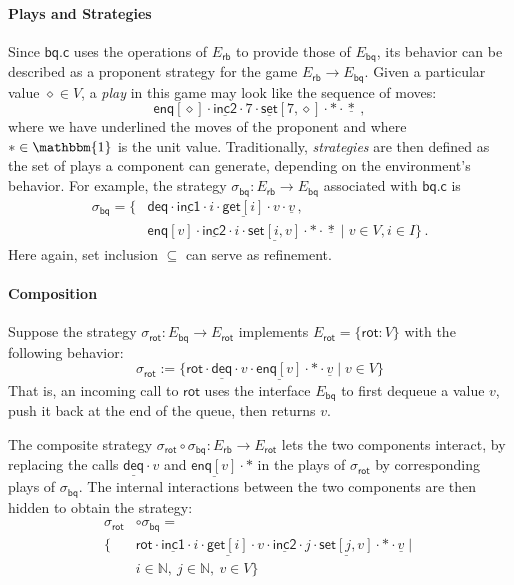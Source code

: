 \documentclass[sigplan,10pt,review,anonymous]{acmart}
\newcommand{\kw}[1]{\ensuremath{ \mathsf{#1} }}
\begin{document}
\paragraph{Plays and Strategies}

Since $\kw{bq.c}$
uses the operations of $E_\kw{rb}$ to
provide those of $E_\kw{bq}$,
its behavior
can be described as a proponent strategy for the game
$E_\kw{rb} \rightarrow E_\kw{bq}$.
Given a particular value $\diamond \in V$,
a \emph{play} in this game may look like the sequence of moves:
\[
  \kw{enq}[\diamond] \cdot
  \underline{\kw{inc2}} \cdot
  7 \cdot
  \underline{\kw{set}}[7, \diamond] \cdot
  * \cdot
  \underline*
  \:,
\]
where we have underlined the moves of the proponent
and where $* \in \mathbbm{1}$ is the unit value.
Traditionally,
\emph{strategies} are then defined as
the set of plays a component can generate,
depending on the environment's behavior.
For example,
the strategy
$\sigma_\kw{bq} : E_\kw{rb} \rightarrow E_\kw{bq}$
associated with $\kw{bq.c}$ is
\begin{align*}
  \sigma_\kw{bq} =
  \{ 
   &\kw{deq} \cdot
    \underline{\kw{inc1}} \cdot
    i \cdot
    \underline{\kw{get}[i]} \cdot
    v \cdot
    \underline{v} \,, \\
   &\kw{enq}[v] \cdot
    \underline{\kw{inc2}} \cdot
    i \cdot
    \underline{\kw{set}[i, v]} \cdot
    * \cdot
    \underline*
  \mid
    v \in V, i \in I
  \}
  \,.
\end{align*}
Here again,
set inclusion $\subseteq$
can serve as refinement.

\paragraph{Composition}

Suppose the strategy
$\sigma_\kw{rot} : E_\kw{bq} \rightarrow E_\kw{rot}$
implements %
$E_\kw{rot} = \{ \kw{rot} : V \}$
with the following behavior:
\[
  \sigma_\kw{rot} := \{
    \kw{rot} \cdot
    \underline{\kw{deq}} \cdot
    v \cdot
    \underline{\kw{enq}[v]} \cdot
    * \cdot
    \underline{v}
    \mid v \in V
  \}
\]
That is,
an incoming call to $\kw{rot}$
uses the interface $E_\kw{bq}$
to first dequeue a value $v$,
push it back at the end of the queue,
then returns $v$.

The composite strategy
$\sigma_\kw{rot} \circ \sigma_\kw{bq} :
 E_\kw{rb} \rightarrow E_\kw{rot}$
lets the two components interact,
by replacing the calls
$\underline{\kw{deq}} \cdot v$
and
$\underline{\kw{enq}[v]} \cdot *$
in the plays of $\sigma_\kw{rot}$
by corresponding plays of $\sigma_\kw{bq}$.
The internal interactions between the two components
are then hidden to obtain the strategy:
\begin{align*}
  \sigma_\kw{rot} &\circ \sigma_\kw{bq} = \\
  \{
   &\kw{rot} \cdot
    \underline{\kw{inc1}} \cdot i \cdot
    \underline{\kw{get}[i]} \cdot v \cdot
    \underline{\kw{inc2}} \cdot j \cdot
    \underline{\kw{set}[j,v]} \cdot * \cdot
    \underline{v}
  \mid {} \\
   &i \in \mathbb{N}, \:
    j \in \mathbb{N}, \:
    v \in V
  \}
\end{align*}
\end{document}
